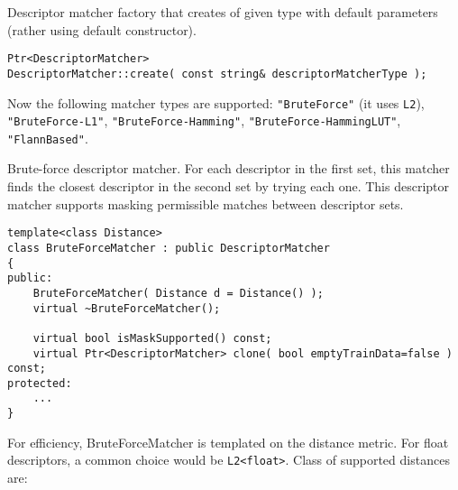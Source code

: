 Descriptor matcher factory that creates  of 
given type with default parameters (rather using default constructor).

\begin{lstlisting}
Ptr<DescriptorMatcher>
DescriptorMatcher::create( const string& descriptorMatcherType );
\end{lstlisting}

\begin{description}
\end{description}
Now the following matcher types are supported: \texttt{"BruteForce"} (it uses \texttt{L2}), \texttt{"BruteForce-L1"}, 
\texttt{"BruteForce-Hamming"}, \texttt{"BruteForce-HammingLUT"}, \texttt{"FlannBased"}.

\label{cv.class.BruteForceMatcher}
Brute-force descriptor matcher. For each descriptor in the first set, this matcher finds the closest
descriptor in the second set by trying each one. This descriptor matcher supports masking 
permissible matches between descriptor sets.

\begin{lstlisting}
template<class Distance>
class BruteForceMatcher : public DescriptorMatcher
{
public:
    BruteForceMatcher( Distance d = Distance() );
    virtual ~BruteForceMatcher();

    virtual bool isMaskSupported() const;
    virtual Ptr<DescriptorMatcher> clone( bool emptyTrainData=false ) const;
protected:
    ...
}
\end{lstlisting}

For efficiency, BruteForceMatcher is templated on the distance metric.
For float descriptors, a common choice would be \texttt{L2<float>}. Class of supported distances are:

